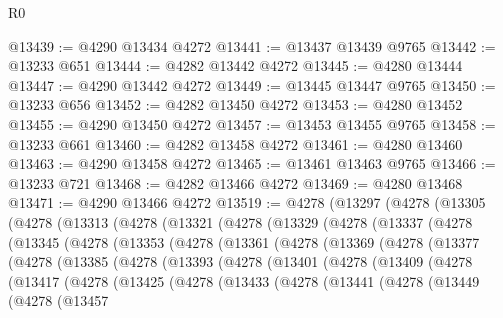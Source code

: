 \begin{lexlean}{R0}
\begin{coremodule}
@13439 := @4290 @13434 @4272
@13441 := @13437 @13439 @9765
@13442 := @13233 @651
@13444 := @4282 @13442 @4272
@13445 := @4280 @13444
@13447 := @4290 @13442 @4272
@13449 := @13445 @13447 @9765
@13450 := @13233 @656
@13452 := @4282 @13450 @4272
@13453 := @4280 @13452
@13455 := @4290 @13450 @4272
@13457 := @13453 @13455 @9765
@13458 := @13233 @661
@13460 := @4282 @13458 @4272
@13461 := @4280 @13460
@13463 := @4290 @13458 @4272
@13465 := @13461 @13463 @9765
@13466 := @13233 @721
@13468 := @4282 @13466 @4272
@13469 := @4280 @13468
@13471 := @4290 @13466 @4272
@13519 := @4278
    (@13297
      (@4278
        (@13305
          (@4278
            (@13313
              (@4278
                (@13321
                  (@4278
                    (@13329
                      (@4278
                        (@13337
                          (@4278
                            (@13345
                              (@4278
                                (@13353
                                  (@4278
                                    (@13361
                                      (@4278
                                        (@13369
                                          (@4278
                                            (@13377
                                              (@4278
                                                (@13385
                                                  (@4278
                                                    (@13393
                                                      (@4278
                                                        (@13401
                                                          (@4278
                                                            (@13409
                                                              (@4278
                                                                (@13417
                                                                  (@4278
                                                                    (@13425
                                                                      (@4278
                                                                        (@13433
                                                                          (@4278
                                                                            (@13441
                                                                              (@4278
                                                                                (@13449
                                                                                  (@4278
                                                                                    (@13457

\end{coremodule}
\end{lexlean}
